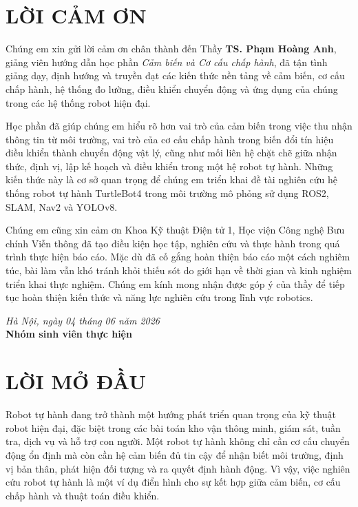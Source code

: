 \section*{LỜI CẢM ƠN}

Chúng em xin gửi lời cảm ơn chân thành đến Thầy \textbf{TS. Phạm Hoàng Anh}, giảng viên hướng dẫn học phần \textit{Cảm biến và Cơ cấu chấp hành}, đã tận tình giảng dạy, định hướng và truyền đạt các kiến thức nền tảng về cảm biến, cơ cấu chấp hành, hệ thống đo lường, điều khiển chuyển động và ứng dụng của chúng trong các hệ thống robot hiện đại.

Học phần đã giúp chúng em hiểu rõ hơn vai trò của cảm biến trong việc thu nhận thông tin từ môi trường, vai trò của cơ cấu chấp hành trong biến đổi tín hiệu điều khiển thành chuyển động vật lý, cũng như mối liên hệ chặt chẽ giữa nhận thức, định vị, lập kế hoạch và điều khiển trong một hệ robot tự hành. Những kiến thức này là cơ sở quan trọng để chúng em triển khai đề tài nghiên cứu hệ thống robot tự hành TurtleBot4 trong môi trường mô phỏng sử dụng ROS2, SLAM, Nav2 và YOLOv8.

Chúng em cũng xin cảm ơn Khoa Kỹ thuật Điện tử 1, Học viện Công nghệ Bưu chính Viễn thông đã tạo điều kiện học tập, nghiên cứu và thực hành trong quá trình thực hiện báo cáo. Mặc dù đã cố gắng hoàn thiện báo cáo một cách nghiêm túc, bài làm vẫn khó tránh khỏi thiếu sót do giới hạn về thời gian và kinh nghiệm triển khai thực nghiệm. Chúng em kính mong nhận được góp ý của thầy để tiếp tục hoàn thiện kiến thức và năng lực nghiên cứu trong lĩnh vực robotics.

\vspace{1cm}
\begin{flushright}
    \setlength{\rightskip}{1cm}
    \textit{Hà Nội, ngày 04 tháng 06 năm 2026}\\
    \vspace{0.5cm}
    \textbf{Nhóm sinh viên thực hiện}
\end{flushright}
\newpage

\section*{LỜI MỞ ĐẦU}

Robot tự hành đang trở thành một hướng phát triển quan trọng của kỹ thuật robot hiện đại, đặc biệt trong các bài toán kho vận thông minh, giám sát, tuần tra, dịch vụ và hỗ trợ con người. Một robot tự hành không chỉ cần cơ cấu chuyển động ổn định mà còn cần hệ cảm biến đủ tin cậy để nhận biết môi trường, định vị bản thân, phát hiện đối tượng và ra quyết định hành động. Vì vậy, việc nghiên cứu robot tự hành là một ví dụ điển hình cho sự kết hợp giữa cảm biến, cơ cấu chấp hành và thuật toán điều khiển.

